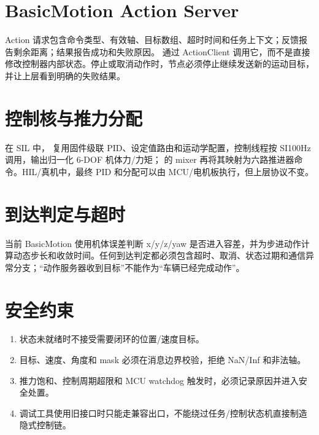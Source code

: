 \section{BasicMotion Action Server}
Action 请求包含命令类型、有效轴、目标数组、超时时间和任务上下文；反馈报告剩余距离；结果报告成功和失败原因。 通过 ActionClient 调用它，而不是直接修改控制器内部状态。停止或取消动作时，节点必须停止继续发送新的运动目标，并让上层看到明确的失败结果。

\section{控制核与推力分配}
在 SIL 中， 复用固件级联 PID、设定值路由和运动学配置，控制线程按 SI{100}{Hz} 调用，输出归一化 6-DOF 机体力/力矩； 的 mixer 再将其映射为六路推进器命令。HIL/真机中，最终 PID 和分配可以由 MCU/电机板执行，但上层协议不变。

\section{到达判定与超时}
当前 BasicMotion 使用机体误差判断 x/y/z/yaw 是否进入容差，并为步进动作计算动态步长和收敛时间。任何到达判定都必须包含超时、取消、状态过期和通信异常分支；“动作服务器收到目标”不能作为“车辆已经完成动作”。

\section{安全约束}
\begin{enumerate}
  \item 状态未就绪时不接受需要闭环的位置/速度目标。
  \item 目标、速度、角度和 mask 必须在消息边界校验，拒绝 NaN/Inf 和非法轴。
  \item 推力饱和、控制周期超限和 MCU watchdog 触发时，必须记录原因并进入安全处置。
  \item 调试工具使用旧接口时只能走兼容出口，不能绕过任务/控制状态机直接制造隐式控制链。
\end{enumerate}

